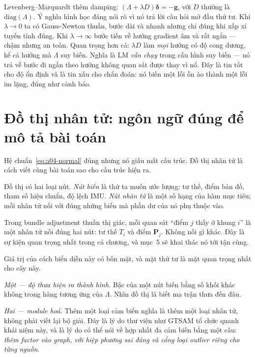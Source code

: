 \documentclass[../../vslam.tex]{subfiles}
\begin{document}
Levenberg--Marquardt thêm damping: \((\Lambda + \lambda D)\boldsymbol{\delta} = -\mathbf{g}\), với \(D\) thường là \(\mathrm{diag}(\Lambda)\). Ý nghĩa hình học đáng nói rõ vì nó trả lời câu hỏi mở đầu thứ tư. Khi \(\lambda \to 0\) ta có Gauss-Newton thuần, bước dài và nhanh nhưng chỉ đúng khi xấp xỉ tuyến tính đúng. Khi \(\lambda \to \infty\) bước tiến về hướng gradient âm và rất ngắn --- chậm nhưng an toàn. Quan trọng hơn cả: \(\lambda D\) làm \emph{mọi} hướng có độ cong dương, kể cả hướng mà \(\Lambda\) suy biến. Nghĩa là LM \emph{vẫn chạy} trong cấu hình suy biến --- nó trả về bước đi ngắn theo hướng không quan sát được thay vì nổ. Đây là tin tốt cho độ ổn định và là tin xấu cho chẩn đoán: nó biến một lỗi ồn ào thành một lỗi im lặng, đúng như  cảnh báo.

\section{Đồ thị nhân tử: ngôn ngữ đúng để mô tả bài toán}

Hệ chuẩn~\eqref{eq:a04-normal} đúng nhưng nó giấu mất cấu trúc. Đồ thị nhân tử là cách viết cùng bài toán sao cho cấu trúc hiện ra.

Đồ thị có hai loại nút. \emph{Nút biến} là thứ ta muốn ước lượng: tư thế, điểm bản đồ, tham số hiệu chuẩn, độ lệch IMU. \emph{Nút nhân tử} là một số hạng của hàm mục tiêu; mỗi nhân tử nối với đúng những biến mà phần dư của nó phụ thuộc vào.

Trong bundle adjustment thuần thị giác, mỗi quan sát ``điểm \(j\) thấy ở khung \(i\)'' là một nhân tử nối đúng hai nút: tư thế \(T_i\) và điểm \(\mathbf{P}_j\). Không nối gì khác. Đây là sự kiện quan trọng nhất trong cả chương, và mục~5 sẽ khai thác nó tới tận cùng.

Giá trị của cách biểu diễn này có bốn mặt, và mặt thứ tư là mặt quan trọng nhất cho cây này.

\emph{Một --- độ thưa hiện ra thành hình.} Bậc của một nút biến bằng số khối khác không trong hàng tương ứng của \(\Lambda\). Nhìn đồ thị là biết ma trận thưa đến đâu.

\emph{Hai --- module hoá.} Thêm một loại cảm biến nghĩa là thêm một loại nhân tử, không phải viết lại bộ giải. Đây là lý do thư viện như GTSAM \cite{dellaert2017factorgraphs} tổ chức quanh khái niệm này, và là lý do  có thể nói về hợp nhất đa cảm biến bằng một câu: \emph{thêm factor vào graph, với hiệp phương sai đúng và cổng loại outlier riêng cho từng nguồn}.
\end{document}
